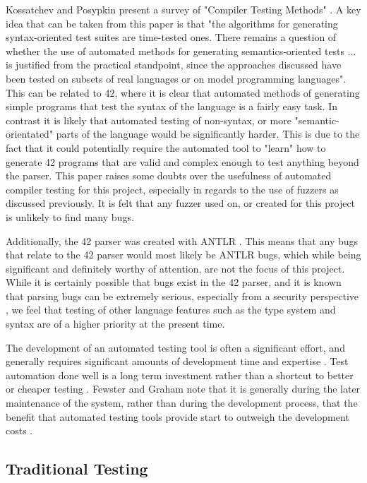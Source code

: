 Kossatchev and Posypkin present a survey of "Compiler Testing Methods" \cite{Kossatchev}. A key idea that can be taken from this paper is that "the algorithms for generating syntax-oriented test suites are time-tested ones. There remains a question of whether the use of automated methods for generating semantics-oriented tests ...  is justified from the practical standpoint, since the approaches discussed have been tested on subsets of real languages or on model programming languages". This can be related to 42, where it is clear that automated methods of generating simple programs that test the syntax of the language is a fairly easy task. In contrast it is likely that automated testing of non-syntax, or more "semantic-orientated" parts of the language would be significantly harder. This is due to the fact that it could potentially require the automated tool to "learn" how to generate 42 programs that are valid and complex enough to test anything beyond the parser. This paper raises some doubts over the usefulness of automated compiler testing for this project, especially in regards to the use of fuzzers as discussed previously. It is felt that any fuzzer used on, or created for this project is unlikely to find many bugs.  

 Additionally, the 42 parser was created with ANTLR \cite{antlr}. This means that any bugs that relate to the 42 parser would most likely be ANTLR bugs, which while being significant and definitely worthy of attention, are not the focus of this project.
While it is certainly possible that bugs exist in the 42 parser, and it is known that parsing bugs can be extremely serious, especially from a security perspective \cite{parserBugs}, we feel that testing of other language features such as the type system and syntax are of a higher priority at the present  time.

The development of an automated testing tool is often a significant effort, and generally requires significant amounts of development time and expertise \cite{enc2}. Test automation done well is a long term investment rather than a shortcut to better or cheaper testing \cite{enc2}. Fewster and Graham note that it is generally during the later maintenance of the system, rather than during the development process, that the benefit that automated testing tools provide start to outweigh the development costs \cite{sta}.

\subsection{Traditional Testing}

